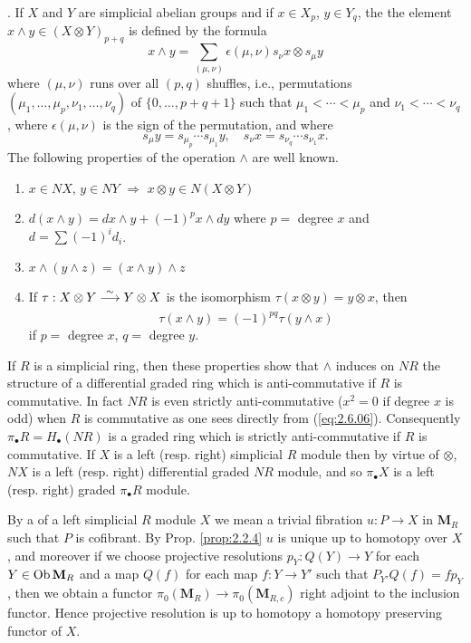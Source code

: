 \documentclass[../main]{subfiles}
\begin{document}
. If $X$ and $Y$ are simplicial abelian groups and if $x\in X_p$, $y\in Y_q$, the the element $x\wedge y\in (X\otimes Y)_{p+q}$ is defined by the formula
\begin{equation}\tag{6}
\label{eq:2.6.06}
    x\wedge y=\sum_{(\mu,\nu)}\epsilon(\mu,\nu)s_{\nu}x\otimes s_{\mu}y
\end{equation}
where $(\mu,\nu)$ runs over all $(p,q)$ shuffles, i.e., permutations $(\mu_1,\dots,\mu_p,\nu_1,\dots,\nu_q)$ of $\{0,\dots,p+q+1\}$ such that $\mu_1<\cdots<\mu_p$ and $\nu_1<\cdots<\nu_q$, where $\epsilon(\mu,\nu)$ is the sign of the permutation, and where
\[s_{\mu}y=s_{\mu_{p}}\cdots s_{\mu_{1}}y,\quad s_{\nu}x=s_{\nu_{q}}\cdots s_{\nu_{1}}x.\]The following properties of the operation $\wedge $ are well known.

\begin{enumerate}[(1)]
    \item $x\in NX$, $y\in NY$ $\Longrightarrow$ $x\otimes y\in N(X\otimes Y)$
    \item $d(x\wedge y)=dx\wedge y+(-1)^px\wedge dy$ where $p=$ degree $x$ and $d=\sum(-1)^id_i$.
    \item $x\wedge (y\wedge z)=(x\wedge y)\wedge z$
    \item If $\tau:X\otimes Y\varrightarrow{\sim}Y\otimes X$ is the isomorphism $\tau(x\otimes y)=y\otimes x$, then \[\tau(x\wedge y)=(-1)^{pq}\tau(y\wedge x)\]if $p=$ degree $x$, $q=$ degree $y$.
\end{enumerate}

If $R$ is a simplicial ring, then these properties show that $\wedge $ induces on $NR$ the structure of a differential graded ring which is anti-commutative if $R$ is commutative. In fact $NR$ is even strictly anti-commutative ($x^2=0$ if degree $x$ is odd) when $R$ is commutative as one sees directly from (\ref{eq:2.6.06}). Consequently $\pi_{\bullet}R=H_{\bullet}(NR)$ is a graded ring which is strictly anti-commutative if $R$ is commutative. If $X$ is a left (resp. right) simplicial $R$ module then by virtue of $\otimes$, $NX$ is a left (resp. right) differential graded $NR$ module, and so $\pi_{\bullet}X$ is a left (resp. right) graded $\pi_{\bullet}R$ module.

By a  of a left simplicial $R$ module $X$ we mean a trivial fibration $u:P\longrightarrow X$ in $\mathbf{M}_R$ such that $P$ is cofibrant. By Prop. \ref{prop:2.2.4} $u$ is unique up to homotopy over $X$, and moreover if we choose projective resolutions $p_Y:Q(Y)\longrightarrow Y$ for each $Y\in\operatorname{Ob}\mathbf{M}_R$ and a map $Q(f)$ for each map $f:Y\longrightarrow Y'$ such that $P_{Y'}Q(f)=fp_{Y}$, then we obtain a functor $\pi_0 (\mathbf{M}_R)\longrightarrow\pi_0 (\mathbf{M}_{R,c})$ right adjoint to the inclusion functor. Hence projective resolution is up to homotopy a homotopy preserving functor of $X$. 
\end{document}
